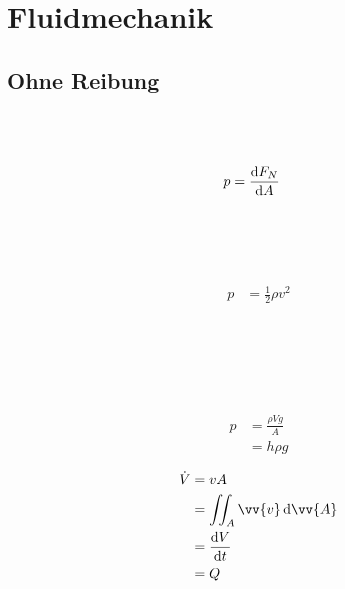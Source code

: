 \section{Fluidmechanik}

\subsection{Ohne Reibung}

\begin{boxleft}
\\
\\
\end{boxleft}\begin{boxrightshaded}
\begin{align*}
p&=\frac{\mathop{}\!\mathrm{d} F_N}{\mathop{}\!\mathrm{d} A}
\end{align*}
\end{boxrightshaded}

\begin{boxleft}
\\
\\
\\
\end{boxleft}\begin{boxrightshaded}
\begin{align*}
p&=\frac{1}{2}\rho v^2
\end{align*}
\end{boxrightshaded}

\begin{boxleft}
\\
\\
\\
\\
\end{boxleft}\begin{boxrightshaded}
\begin{align*}
p&=\frac{\rho V g}{A}\\
&=h\rho g
\end{align*}
\end{boxrightshaded}

\begin{boxleft}
\end{boxleft}\begin{boxrightshaded}
\begin{align*}
\dot{V}&=v A\\
&=\iint_A \vv{v} \diff\vv{ A}\\
&=\frac{\diff V}{\diff t}\\
&=Q
\end{align*}
\end{boxrightshaded}

